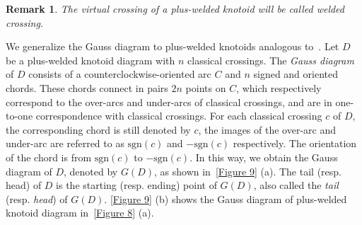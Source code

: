 \documentclass[11pt]{amsart}
\theoremstyle{noparens}
\newtheorem{remark}{Remark}[section]
\numberwithin{equation}{section}
\numberwithin{equation}{section}
\begin{document}
\begin{remark}
 \rm{The virtual crossing of a plus-welded knotoid will be called \textit{welded crossing}.} 
\end{remark}

We generalize the Gauss diagram to plus-welded knotoids analogous to~\citep{kim2018family}.
Let $D$ be a plus-welded knotoid diagram with $n$ classical crossings. The \textit{Gauss diagram} of $D$ consists of a counterclockwise-oriented arc $C$ and $n$ signed and oriented chords. These chords connect in pairs $2n$  points on $C$, which respectively correspond to the over-arcs and under-arcs of classical crossings, and are in one-to-one correspondence with classical crossings. For each classical crossing $c$ of $D$, the corresponding chord is still denoted  by $c$, the images of the over-arc and under-arc are referred to as $\text{sgn}(c)$ and $-\text{sgn}(c)$ respectively. The orientation of the chord is from $\text{sgn}(c)$ to $-\text{sgn}(c)$. In this way, we obtain the Gauss diagram of $D$, denoted by $G(D)$, as shown in~\cref{Figure 9} (a).
The tail (resp. head) of $D$ is the starting (resp. ending) point of $G(D)$, also called the \textit{tail} (resp. \textit{head}) of $G(D)$. \cref{Figure 9} (b) shows the Gauss diagram of plus-welded knotoid diagram in~\cref{Figure 8} (a). 
\end{document}
